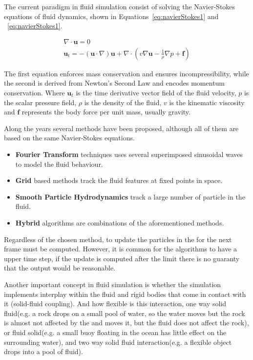 The current paradigm in fluid simulation consist of solving the Navier-Stokes equations of fluid dynamics, shown in Equations~\ref{eq:navierStokes1} and  ~\ref{eq:navierStokes1}.

\begin{gather}
\label{eq:navierStokes1}
\nabla \cdot \mathbf{u} = 0\\
\label{eq:navierStokes2}
\mathbf{u}_t = -(\mathbf{u} \cdot \nabla)\mathbf{u} + \nabla \cdot ( v \nabla \mathbf{u} - \frac{1}{\rho} \nabla p + \mathbf{f} )
\end{gather}

The first equation enforces mass conservation and ensures incompressibility, while the second is derived from Newton's Second Law and encodes momentum conservation.
Where $\mathbf{u}_t$ is the time derivative vector field of the fluid velocity, $p$  is the scalar pressure field, $\rho$ is the density of the fluid, $v$ is the kinematic viscosity and $\mathbf{f}$ represents the body force per unit mass, usually gravity.

Along the years several methods have been proposed, although all of them are based on the same Navier-Stokes equations.

\begin{itemize}
\item \textbf{Fourier Transform} techniques uses several superimposed sinusoidal waves to model the fluid behaviour.
\item \textbf{Grid} based methods track the fluid features at fixed points in space.
\item \textbf{Smooth Particle Hydrodynamics} track a large number of particle in the fluid.
\item \textbf{Hybrid} algorithms are combinations of the aforementioned methods.
\end{itemize}

Regardless of the chosen method, to update the particles in the for the next frame must be computed.
However, it is common for the algorithms to have a upper time step, if the update is computed after the limit there is no guaranty that the output would be reasonable.

Another important concept in fluid simulation is whether the simulation implements interplay within the fluid and rigid bodies that come in contact with it (solid-fluid coupling).
And how flexible is this interaction, one way solid fluid(e.g. a rock drops on a small pool of water, so the water moves but the rock is almost not affected by the  and moves it, but the fluid does not affect the rock), or fluid solid(e.g. a small buoy floating in the ocean has little effect on the surrounding water), and two way solid fluid interaction(e.g. a flexible object drops into a pool of fluid).


